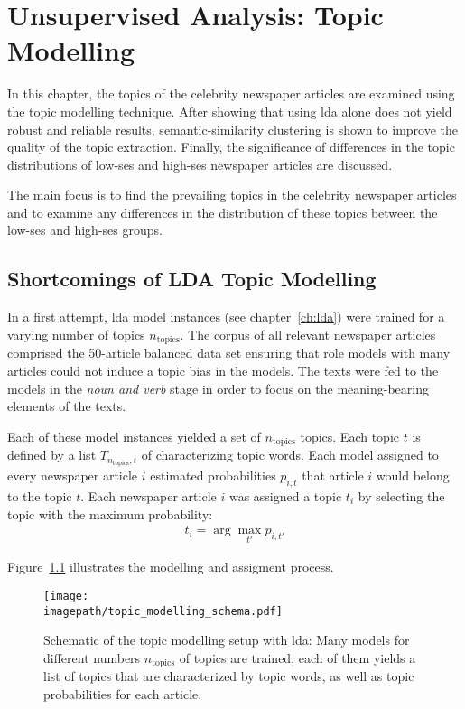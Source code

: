 \renewcommand{\imagepath}{../50-unsupervised/img}
\newcommand{\ntopics}{n_\text{topics}}
\newcommand{\nclusters}{n_\text{clusters}}

\chapter{Unsupervised Analysis: Topic Modelling}\label{ch:unsupervised}
In this chapter, the topics of the celebrity newspaper articles are examined using the topic modelling technique. After showing that using \gls{lda} alone does not yield robust and reliable results, semantic-similarity clustering is shown to improve the quality of the topic extraction.  Finally, the significance of differences in the topic distributions of low-\gls{ses} and high-\gls{ses} newspaper articles are discussed.

The main focus is to find the prevailing topics in the celebrity newspaper articles and to examine any differences in the distribution of these topics between the low-\gls{ses} and high-\gls{ses} groups.

\section{Shortcomings of LDA Topic Modelling}
In a first attempt, \gls{lda} model instances (see chapter~\ref{ch:lda}) were trained for a varying number of topics $\ntopics$. The corpus of all relevant newspaper articles comprised the 50-article balanced data set ensuring that role models with many articles could not induce a topic bias in the models. The texts were fed to the models in the \textit{noun and verb} stage in order to focus on the meaning-bearing elements of the texts.

Each of these model instances yielded a set of $\ntopics$ topics. Each topic $t$ is defined by a list $T_{\ntopics, t}$ of characterizing topic words. Each model assigned to every newspaper article $i$ estimated probabilities $p_{i, t}$ that article $i$ would belong to the topic $t$. Each newspaper article $i$ was assigned a topic $t_i$ by selecting the topic with the maximum probability:
\begin{align}
    t_i = \arg \max_{t'} p_{i, t'}
\end{align}

Figure~\ref{fig:topic_modelling_schema} illustrates the modelling and assigment process.
\begin{figure}
    \centering
    \texttt{[image: \\imagepath/topic\_modelling\_schema.pdf]}
    \caption{Schematic of the topic modelling setup with \gls{lda}: Many models for different numbers $\ntopics$ of topics are trained, each of them yields a list of topics that are characterized by topic words, as well as topic probabilities for each article.}\label{fig:topic_modelling_schema}
\end{figure}

